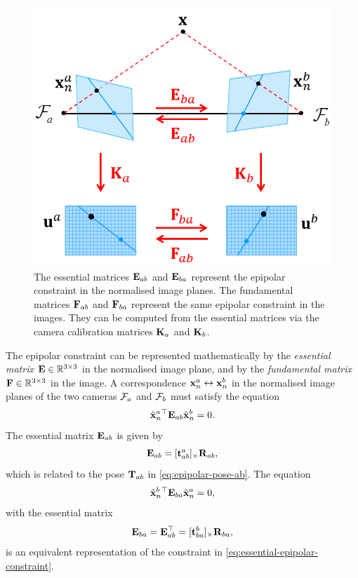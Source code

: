 \begin{figure}[htb]
    \centering
    \includegraphics[width=0.5\columnwidth]{figures/essential-and-fundamental-matrices.png}
    \caption{The essential matrices ${\boldsymbol{\mathbf{E}}}_{ab}$ and ${\boldsymbol{\mathbf{E}}}_{ba}$ represent the epipolar constraint in the normalised image planes.
    The fundamental matrices ${\boldsymbol{\mathbf{F}}}_{ab}$ and ${\boldsymbol{\mathbf{F}}}_{ba}$ represent the same epipolar constraint in the images.
    They can be computed from the essential matrices via the camera calibration matrices ${\boldsymbol{\mathbf{K}}}_a$ and ${\boldsymbol{\mathbf{K}}}_b$.
    }
    \label{fig:essential-and-fundamental-matrices}
\end{figure}
The epipolar constraint can be represented mathematically by the \emph{essential matrix} ${\boldsymbol{\mathbf{E}}} \in {\mathbb R}^{3 \times 3}$ in the normalised image plane, and by the \emph{fundamental matrix} ${\boldsymbol{\mathbf{F}}} \in {\mathbb R}^{3 \times 3}$ in the image.
A correspondence ${\boldsymbol{\mathbf{x}}}^a_n \leftrightarrow {\boldsymbol{\mathbf{x}}}^b_n$ in the normalised image planes of the two cameras $\mathcal{F}_a$ and $\mathcal{F}_b$ must satisfy the equation
\begin{equation} \label{eq:essential-epipolar-constraint}
  \tilde{{\boldsymbol{\mathbf{x}}}}^a_n{}^{\top} {\boldsymbol{\mathbf{E}}}_{ab} \tilde{{\boldsymbol{\mathbf{x}}}}^b_n = 0.
\end{equation}
The essential matrix ${\boldsymbol{\mathbf{E}}}_{ab}$ is given by
\begin{equation} \label{eq:essential-structure}
  {\boldsymbol{\mathbf{E}}}_{ab} = [{\boldsymbol{\mathbf{t}}}^a_{ab}]_\times {\boldsymbol{\mathbf{R}}}_{ab},
\end{equation}
which is related to the pose ${\boldsymbol{\mathbf{T}}}_{ab}$ in \eqref{eq:epipolar-pose-ab}.
The equation
\begin{equation}
  \tilde{{\boldsymbol{\mathbf{x}}}}^b_n{}^{\top} {\boldsymbol{\mathbf{E}}}_{ba} \tilde{{\boldsymbol{\mathbf{x}}}}^a_n = 0,
\end{equation}
with the essential matrix
\begin{equation}
  {\boldsymbol{\mathbf{E}}}_{ba} = {\boldsymbol{\mathbf{E}}}_{ab}^{\top} = [{\boldsymbol{\mathbf{t}}}^b_{ba}]_\times {\boldsymbol{\mathbf{R}}}_{ba},
\end{equation}
is an equivalent representation of the constraint in \eqref{eq:essential-epipolar-constraint}.

